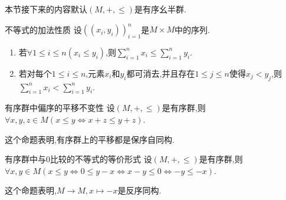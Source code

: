 本节接下来的内容默认$\left(M,+,\leq\right)$是有序幺半群.

\begin{proposition}{不等式的加法性质}{}
	设$\left(\left(x_{i},y_{i}\right)\right)_{i=1}^{n}$是$M\times M$中的序列.
	\begin{enumerate}
		\item 若$\forall 1\leq i\leq n\left(x_{i}\leqslant y_{i}\right)$,则$\sum\limits_{i=1}^{n}x_{i}\leqslant\sum\limits_{i=1}^{n}y_{i}$.
		\item 若对每个$1\leq i\leq n$,元素$x_{i}$和$y_{i}$都可消去,并且存在$1\leq j\leq n$使得$x_{j}<y_{j}$,则$\sum\limits_{i=1}^{n}x_{i}<\sum\limits_{i=1}^{n}y_{i}$.
	\end{enumerate}
\end{proposition}

\begin{proposition}{有序群中偏序的平移不变性}{}
	设$\left(M,+,\leq\right)$是有序群,则$\forall x,y,z\in M\left(x\leqslant y\iff x+z\leqslant y+z\right)$.
\end{proposition}

\begin{remark}{}{}
	这个命题表明,有序群上的平移都是保序自同构.
\end{remark}

\begin{corollary}{有序群中与$0$比较的不等式的等价形式}{}
	设$\left(M,+,\leq\right)$是有序群,则$\forall x,y\in M\left(x\leqslant y\iff 0\leqslant y-x\iff x-y\leqslant 0\iff -y\leqslant -x\right)$.
\end{corollary}

\begin{remark}{}{}
	这个命题表明,$M\to M,x\mapsto -x$是反序同构.
\end{remark}


